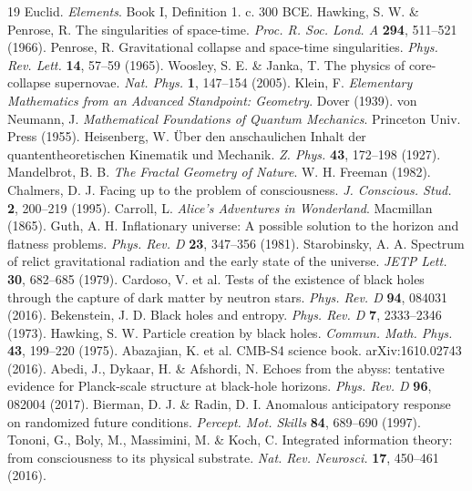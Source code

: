 \documentclass[11pt,a4paper]{article}
\theoremstyle{definition}
\begin{document}
\begin{thebibliography}{19}
 Euclid. \textit{Elements}. Book I, Definition 1. c. 300 BCE.
 Hawking, S. W. \& Penrose, R. The singularities of space-time. \textit{Proc. R. Soc. Lond. A} \textbf{294}, 511--521 (1966).
 Penrose, R. Gravitational collapse and space-time singularities. \textit{Phys. Rev. Lett.} \textbf{14}, 57--59 (1965).
 Woosley, S. E. \& Janka, T. The physics of core-collapse supernovae. \textit{Nat. Phys.} \textbf{1}, 147--154 (2005).
 Klein, F. \textit{Elementary Mathematics from an Advanced Standpoint: Geometry}. Dover (1939).
 von Neumann, J. \textit{Mathematical Foundations of Quantum Mechanics}. Princeton Univ. Press (1955).
 Heisenberg, W. \"Uber den anschaulichen Inhalt der quantentheoretischen Kinematik und Mechanik. \textit{Z. Phys.} \textbf{43}, 172--198 (1927).
 Mandelbrot, B. B. \textit{The Fractal Geometry of Nature}. W. H. Freeman (1982).
 Chalmers, D. J. Facing up to the problem of consciousness. \textit{J. Conscious. Stud.} \textbf{2}, 200--219 (1995).
 Carroll, L. \textit{Alice's Adventures in Wonderland}. Macmillan (1865).
 Guth, A. H. Inflationary universe: A possible solution to the horizon and flatness problems. \textit{Phys. Rev. D} \textbf{23}, 347--356 (1981).
 Starobinsky, A. A. Spectrum of relict gravitational radiation and the early state of the universe. \textit{JETP Lett.} \textbf{30}, 682--685 (1979).
 Cardoso, V. et al. Tests of the existence of black holes through the capture of dark matter by neutron stars. \textit{Phys. Rev. D} \textbf{94}, 084031 (2016).
 Bekenstein, J. D. Black holes and entropy. \textit{Phys. Rev. D} \textbf{7}, 2333--2346 (1973).
 Hawking, S. W. Particle creation by black holes. \textit{Commun. Math. Phys.} \textbf{43}, 199--220 (1975).
 Abazajian, K. et al. CMB-S4 science book. arXiv:1610.02743 (2016).
 Abedi, J., Dykaar, H. \& Afshordi, N. Echoes from the abyss: tentative evidence for Planck-scale structure at black-hole horizons. \textit{Phys. Rev. D} \textbf{96}, 082004 (2017).
 Bierman, D. J. \& Radin, D. I. Anomalous anticipatory response on randomized future conditions. \textit{Percept. Mot. Skills} \textbf{84}, 689--690 (1997).
 Tononi, G., Boly, M., Massimini, M. \& Koch, C. Integrated information theory: from consciousness to its physical substrate. \textit{Nat. Rev. Neurosci.} \textbf{17}, 450--461 (2016).



\end{thebibliography}
\end{document}
